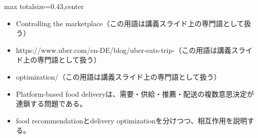 \clearpage
{}
\begin{minipage}[t]{0.405\textwidth}
\begin{adjustbox}{max totalsize={\textwidth}{0.43\textheight},center}
\begin{minipage}{\textwidth}\scriptsize
{}\begin{itemize}
\item Controlling the marketplace（この用語は講義スライド上の専門語として扱う）
\item https://www.uber.com/en-DE/blog/uber-eats-trip-（この用語は講義スライド上の専門語として扱う）
\item optimization/（この用語は講義スライド上の専門語として扱う）
\end{itemize}\begin{itemize}
\item Platform-based food deliveryは、需要・供給・推薦・配送の複数意思決定が連鎖する問題である。
\item food recommendationとdelivery optimizationを分けつつ、相互作用を説明する。
\end{itemize}
\end{minipage}
\end{adjustbox}
\end{minipage}\hfill
